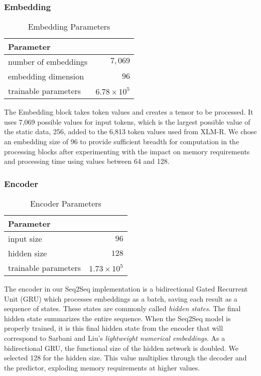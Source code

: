 \subsubsection{Embedding}
\begin{table}[h]
  \caption{Embedding Parameters}
  \label{tab:ae_embed}
  \begin{tabular}{p{} r}
    \toprule
    Parameter & \\
    \midrule
    number of embeddings & $7,069$ \\
    embedding dimension & $96$ \\
    \midrule
    trainable parameters &  $6.78 \times 10^{5}$ \\
    \bottomrule
  \end{tabular}
\end{table}
The Embedding block takes token values and creates a tensor to be processed.  It uses 7,069 possible values for input tokens, which is the largest possible value of the static data, 256, added to the 6,813 token values used from XLM-R. We chose an embedding size of 96 to provide sufficient breadth for computation in the processing blocks after experimenting with the impact on memory requirements and processing time using values between 64 and 128.

\subsubsection{Encoder}
\begin{table}[h]
  \caption{Encoder Parameters}
  \label{tab:ae_encoder}
  \begin{tabular}{p{} r}
    \toprule
    Parameter & \\
    \midrule
    input size & $96$ \\
    hidden size & $128$ \\
    \midrule
    trainable parameters &  $1.73 \times 10^{5}$ \\
    \bottomrule
  \end{tabular}
\end{table}
The encoder in our Seq2Seq implementation is a bidirectional Gated Recurrent Unit (GRU) which processes embeddings as a batch, saving each result as a sequence of states. These states are commonly called \textit{hidden states}.  The final hidden state summarizes the entire sequence. When the Seq2Seq model is properly trained, it is this final hidden state from the encoder that will correspond to Sarbani and Liu's \textit{lightweight numerical embeddings}. As a bidirectional GRU, the functional size of the hidden network is doubled.  We selected 128 for the hidden size. This value multiplies through the decoder and the predictor, exploding memory requirements at higher values. 

